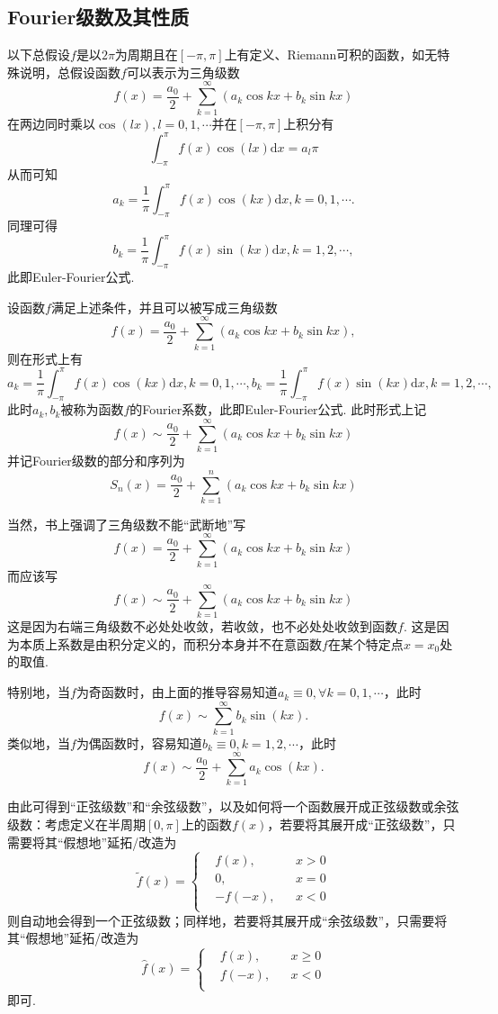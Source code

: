 \documentclass{ctexart}
\begin{document}
\subsection{Fourier级数及其性质}
以下总假设$f$是以$2\pi$为周期且在$[-\pi,\pi]$上有定义、Riemann可积的函数，如无特殊说明，总假设函数$f$可以表示为三角级数
$$f(x)=\frac{a_{0}}{2}+\sum_{k=1}^{\infty}{(a_{k}\cos{kx}+b_{k}\sin{kx})}$$
在两边同时乘以$\cos{(lx)},l=0,1,\cdots$并在$[-\pi,\pi]$上积分有
$$\int_{-\pi}^{\pi}{f(x)\cos{(lx)}\mathrm{d}x}=a_{l}\pi$$
从而可知
$$a_{k}=\frac{1}{\pi}\int_{-\pi}^{\pi}{f(x)\cos{(kx)}\mathrm{d}x},k=0,1,\cdots.$$
同理可得
$$b_{k}=\frac{1}{\pi}\int_{-\pi}^{\pi}{f(x)\sin{(kx)}\mathrm{d}x},k=1,2,\cdots,$$
此即Euler-Fourier公式.

\begin{theorem}
设函数$f$满足上述条件，并且可以被写成三角级数
$$f(x)=\frac{a_{0}}{2}+\sum_{k=1}^{\infty}{(a_{k}\cos{kx}+b_{k}\sin{kx})},$$
则在形式上有
$$a_{k}=\frac{1}{\pi}\int_{-\pi}^{\pi}{f(x)\cos{(kx)}\mathrm{d}x},k=0,1,\cdots, b_{k}=\frac{1}{\pi}\int_{-\pi}^{\pi}{f(x)\sin{(kx)}\mathrm{d}x},k=1,2,\cdots,$$
此时$a_{k},b_{k}$被称为函数$f$的Fourier系数，此即Euler-Fourier公式. 此时形式上记
$$f(x)\sim \frac{a_{0}}{2}+\sum_{k=1}^{\infty}{(a_{k}\cos{kx}+b_{k}\sin{kx})}$$
并记Fourier级数的部分和序列为
$$S_{n}(x)=\frac{a_{0}}{2}+\sum_{k=1}^{n}{(a_{k}\cos{kx}+b_{k}\sin{kx})}$$
\end{theorem}

当然，书上强调了三角级数不能“武断地”写
$$f(x)= \frac{a_{0}}{2}+\sum_{k=1}^{\infty}{(a_{k}\cos{kx}+b_{k}\sin{kx})}$$
而应该写
$$f(x)\sim \frac{a_{0}}{2}+\sum_{k=1}^{\infty}{(a_{k}\cos{kx}+b_{k}\sin{kx})}$$
这是因为右端三角级数不必处处收敛，若收敛，也不必处处收敛到函数$f$. 这是因为本质上系数是由积分定义的，而积分本身并不在意函数$f$在某个特定点$x=x_{0}$处的取值.

特别地，当$f$为奇函数时，由上面的推导容易知道$a_{k}\equiv 0,\forall k=0,1,\cdots$，此时
$$f(x)\sim \sum_{k=1}^{\infty}{b_{k}\sin{(kx)}}.$$
类似地，当$f$为偶函数时，容易知道$b_{k}\equiv 0,k=1,2,\cdots$，此时
$$f(x)\sim \frac{a_{0}}{2}+\sum_{k=1}^{\infty}{a_{k}\cos{(kx)}}.$$

由此可得到“正弦级数”和“余弦级数”，以及如何将一个函数展开成正弦级数或余弦级数：考虑定义在半周期$[0,\pi]$上的函数$f(x)$，若要将其展开成“正弦级数”，只需要将其“假想地”延拓/改造为
$$\tilde{f}(x)=\left\{\begin{aligned}&f(x),&& x> 0\\ &0,&& x=0\\ &-f(-x),&& x<0\\\end{aligned}\right.$$
则自动地会得到一个正弦级数；同样地，若要将其展开成“余弦级数”，只需要将其“假想地”延拓/改造为
$$\hat{f}(x)=\left\{\begin{aligned}&f(x),&& x\geq 0\\ &f(-x),&& x<0\\\end{aligned}\right.$$
即可.
\end{document}
